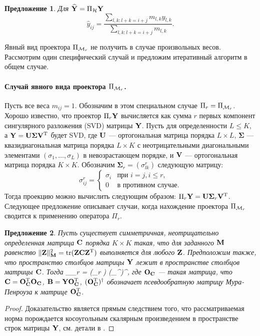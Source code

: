 \documentclass[12pt, specialist, subf,href,colorlinks=true,substylefile = spbu.rtx]{disser}
\DeclareMathOperator{\tr}{tr}
\newtheorem{proposition}{Предложение}
\theoremstyle{remark}
\theoremstyle{definition}
\begin{document}
\begin{proposition}
Для $\widehat{\mathbf{Y}}=\Pi_{\mathcal{H}} \mathbf{Y}$
\begin{equation}\label{diag_averag}
\hat{y}_{ij} = \frac{\sum_{l,k: l+k=i+j} m_{l,k} y_{l,k}}{\sum_{l,k: l+k=i+j} m_{l,k}}.
\end{equation}
\end{proposition}

Явный вид проектора $\Pi_{\mathcal{M}_r}$ не получить в случае произвольных весов.
Рассмотрим один специфический случай и предложим итеративный алгоритм в общем случае.

\paragraph{Случай явного вида проектора $\Pi_{\mathcal{M}_r}$.}
\label{sec:projMr}
\label{sec:obliqueSVD}
Пусть все веса $m_{ij}=1$. Обозначим в этом специальном случае $\Pi_r=\Pi_{\mathcal{M}_r}$.
Хорошо известно, что проектор $\Pi_{r} \mathbf{Y}$
вычисляется как сумма $r$ первых компонент сингулярного разложения (SVD) матрицы $\mathbf{Y}$. Пусть для определенности $L\le K$, а $\mathbf{Y} = \mathbf{U} \mathbf{\Sigma} \mathbf{V}^{\mathrm{T}}$ будет SVD, где $\mathbf{U}$ --- ортогональная матрица порядка $L \times L$, $\mathbf{\Sigma}$ --- квазидиагональная матрица порядка $L \times K$ с неотрицательными диагональными элементами $(\sigma_1, \ldots, \sigma_L)$ в невозрастающем порядке, и $\mathbf{V}$ --- ортогональная матрица порядка $K \times K$. Обозначим $\mathbf{\Sigma}_r = (\sigma^r_{l k})$ следующую матрицу:
\begin{equation*}
\sigma^r_{i j} = \begin{cases}
\sigma_i & \text{при $i = j, i \le r,$}\\
0 & \text{в противном случае}.
\end{cases}
\end{equation*}
Тогда проекцию можно вычислить следующим образом: $\Pi_{r} \mathbf{Y}  = \mathbf{U} \mathbf{\Sigma}_r \mathbf{V}^{\mathrm{T}}$.
Следующее предложение описывает случаи, когда нахождение проектора $\Pi_{\mathcal{M}_r}$ сводится к применению оператора $\Pi_r$.

\begin{proposition}
\label{prop:projS}
Пусть существует симметричная, неотрицательно оп\-ре\-де\-лен\-ная матрица  $\mathbf{C}$ порядка $K \times K$ 
такая, что для заданного $\mathbf{M}$ равенство $\|\bfZ\|^2_\bfM = \tr(\bfZ \bfC \bfZ^\rmT)$ выполняется для любого $\mathbf{Z}$.
Предположим также, что пространство столбцов матрицы $\mathbf{Y}$ лежит в пространстве столбцов матрицы $\mathbf{C}$.
Тогда
\be
\label{eq:PiMr}
\Pi_{\calM_r} \bfY = (\Pi_r \bfB) (\bfO_\bfC^{\rmT})^\dagger,
\ee
где $\mathbf{O}_{\mathbf{C}}$ --- такая матрица, что $\mathbf{C} = \mathbf{O}_{\mathbf{C}}^{\mathrm{T}}\mathbf{O}_{\mathbf{C}}$,
$\mathbf{B} = \mathbf{Y} \mathbf{O}_{\mathbf{C}}^{\mathrm{T}}$, $(\mathbf{O}_{\mathbf{C}}^{\mathrm{T}})^\dagger$ обозначает псевдообратную матрицу Мура-Пенроуза к матрице $\mathbf{O}_{\mathbf{C}}^{\mathrm{T}}$.
\end{proposition}
\begin{proof}
Доказательство является прямым следствием того, что рассматриваемая норма порождается косоугольным скалярным произведением в пространстве строк матрицы $\mathbf{Y}$, см. детали в \cite{Golyandina2013, Allen2014}.
\end{proof}
\end{document}
